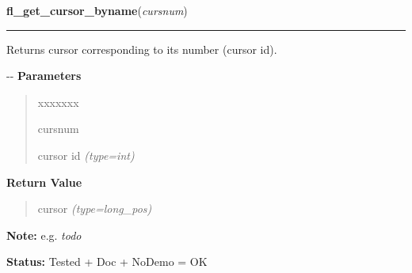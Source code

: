     \label{xformslib:flcursor:fl_get_cursor_byname}

    \vspace{0.5ex}

\hspace{.8\funcindent}\begin{boxedminipage}{\funcwidth}

    \raggedright \textbf{fl\_get\_cursor\_byname}(\textit{cursnum})

    \vspace{-1.5ex}

    \rule{\textwidth}{0.5\fboxrule}
\setlength{\parskip}{2ex}

Returns cursor corresponding to its number (cursor id).

-{}-
\setlength{\parskip}{1ex}
      \textbf{Parameters}
      \vspace{-1ex}

      \begin{quote}
        \begin{Ventry}{xxxxxxx}

          \item[cursnum]


cursor id
            {\it (type=int)}

        \end{Ventry}

      \end{quote}

      \textbf{Return Value}
    \vspace{-1ex}

      \begin{quote}

cursor
      {\it (type=long\_pos)}

      \end{quote}

\textbf{Note:} 
e.g. \emph{todo}


\textbf{Status:} 
Tested + Doc + NoDemo = OK


    \end{boxedminipage}

    \label{xformslib:flcursor:fl_reset_cursor}

    \vspace{0.5ex}

